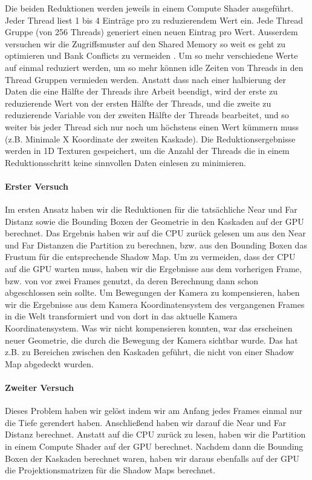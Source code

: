 \documentclass[runningheaders,a4paper]{llncs}
\begin{document}
Die beiden Reduktionen werden jeweils in einem Compute Shader ausgeführt. Jeder Thread liest 1 bis 4 Einträge pro zu reduzierendem Wert ein. Jede Thread Gruppe (von 256 Threads) generiert einen neuen Eintrag pro Wert.
Ausserdem versuchen wir die Zugriffsmuster auf den Shared Memory so weit es geht zu optimieren und Bank Conflicts zu vermeiden \cite{reduction}.
Um so mehr verschiedene Werte auf einmal reduziert werden, um so mehr können idle Zeiten von Threads in den Thread Gruppen vermieden werden.
Anstatt dass nach einer halbierung der Daten die eine Hälfte der Threads ihre Arbeit beendigt, wird der erste zu reduzierende Wert von der ersten Hälfte der Threads, und die zweite zu reduzierende Variable von der zweiten Hälfte der Threads bearbeitet, und so weiter bis jeder Thread sich nur noch um höchstens einen Wert kümmern muss (z.B. Minimale X Koordinate der zweiten Kaskade).
Die Reduktionsergebnisse werden in 1D Texturen gespeichert, um die Anzahl der Threads die in einem Reduktionsschritt keine sinnvollen Daten einlesen zu minimieren.



\paragraph{Erster Versuch}
Im ersten Ansatz haben wir die Reduktionen für die tatsächliche Near und Far Distanz sowie die Bounding Boxen der Geometrie in den Kaskaden auf der GPU berechnet.
Das Ergebnis haben wir auf die CPU zurück gelesen um aus den Near und Far Distanzen die Partition zu berechnen, bzw. aus den Bounding Boxen das Frustum für die entsprechende Shadow Map.
Um zu vermeiden, dass der CPU auf die GPU warten muss, haben wir die Ergebnisse aus dem vorherigen Frame, bzw. von vor zwei Frames genutzt, da deren Berechnung dann schon abgeschlossen sein sollte.
Um Bewegungen der Kamera zu kompensieren, haben wir die Ergebnisse aus dem Kamera Koordinatensystem des vergangenen Frames in die Welt transformiert und von dort in das aktuelle Kamera Koordinatensystem.
Was wir nicht kompensieren konnten, war das erscheinen neuer Geometrie, die durch die Bewegung der Kamera sichtbar wurde.
Das hat z.B. zu Bereichen zwischen den Kaskaden geführt, die nicht von einer Shadow Map abgedeckt wurden.

\paragraph{Zweiter Versuch}
Dieses Problem haben wir gelöst indem wir am Anfang jedes Frames einmal nur die Tiefe gerendert haben.
Anschließend haben wir darauf die Near und Far Distanz berechnet.
Anstatt auf die CPU zurück zu lesen, haben wir die Partition in einem Compute Shader auf der GPU berechnet.
Nachdem dann die Bounding Boxen der Kaskaden berechnet waren, haben wir daraus ebenfalls auf der GPU die Projektionsmatrizen für die Shadow Maps berechnet.
\end{document}

